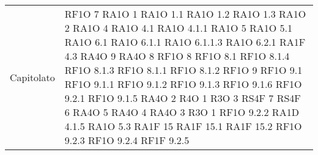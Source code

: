 \begin{center}
\begin{longtable}{ | p{5cm} | p{5cm} |}
            Capitolato &  RF1O 7 \newline  RA1O 1 \newline  RA1O 1.1 \newline  RA1O 1.2 \newline  RA1O 1.3  \newline  RA1O 2  \newline  RA1O 4 \newline  RA1O 4.1  \newline  RA1O 4.1.1  \newline  RA1O 5  \newline  RA1O 5.1 \newline  RA1O 6.1  \newline  RA1O 6.1.1  \newline  RA1O 6.1.1.3  \newline  RA1O 6.2.1 \newline  RA1F 4.3 \newline  RA4O 9 \newline  RA4O 8 \newline  RF1O 8  \newline  RF1O 8.1  \newline  RF1O 8.1.4  \newline  RF1O 8.1.3  \newline  RF1O 8.1.1  \newline  RF1O 8.1.2 \newline  RF1O 9  \newline  RF1O 9.1  \newline  RF1O 9.1.1  \newline  RF1O 9.1.2  \newline  RF1O 9.1.3  \newline  RF1O 9.1.6 \newline  RF1O 9.2.1  \newline  RF1O 9.1.5 \newline  RA4O 2 \newline  R4O 1 \newline  R3O 3 \newline  RS4F 7 \newline  RS4F 6 \newline  RA4O 5 \newline  RA4O 4 \newline  RA4O 3 \newline  R3O 1 \newline  RF1O 9.2.2  \newline  RA1D 4.1.5 \newline  RA1O 5.3 \newline  RA1F 15 \newline  RA1F 15.1 \newline  RA1F 15.2 \newline  RF1O 9.2.3 \newline  RF1O 9.2.4 \newline  RF1F 9.2.5 \newline  
\end{longtable}
\end{center}
